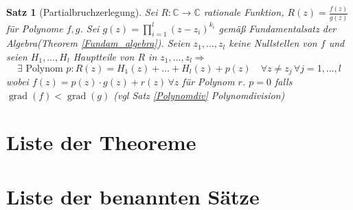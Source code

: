 \documentclass[ngerman,a4paper]{report}
\theoremstyle{break}
\newtheorem{satz}[theorem]{Satz}
\DeclareMathOperator{\grad}{grad}
\begin{document}
\begin{satz}[Partialbruchzerlegung]
    Sei $R: \mathbb{C} \to \mathbb{C}$ rationale Funktion, $R(z)=\frac{f(z)}{g(z)}$ für Polynome $f,g$. Sei $g(z) = \prod_{i=1}^{l}(z-z_i)^{k_i}$ gemäß Fundamentalsatz der Algebra(Theorem \ref{Fundam_algebra}). Seien $z_1,\dots,z_l$ keine Nullstellen von $f$ und seien $H_1,\dots,H_l$ Hauptteile von $R$ in $z_1,\dots,z_l \Rightarrow$
    \[
    \exists \text{ Polynom } p:R(z)=H_1(z)+\dots+H_l(z)+p(z) \quad\forall z \neq z_j \,\forall j = 1,\dots,l
    \]
    wobei $f(z) = p(z)\cdot g(z) + r(z)\,\forall z$ für Polynom $r$. $p=0$ falls $\grad(f) < \grad(g)$ (vgl Satz \ref{Polynomdiv} Polynomdivision)
\end{satz}

\chapter*{Liste der Theoreme}
\chapter*{Liste der benannten Sätze}
\printglossary[type=\acronymtype]
\printindex
{}
\printindex[symbols]
\end{document}
